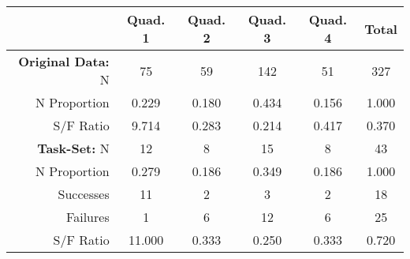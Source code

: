 \begin{tabular}{r|cccc|c}
                      & Quad. 1 & Quad. 2 & Quad. 3 & Quad. 4 & Total \\ \hline
\textbf{Original Data: }N &      75 &      59 &     142 &      51 &   327 \\
         N Proportion &   0.229 &   0.180 &   0.434 &   0.156 & 1.000 \\
            S/F Ratio &   9.714 &   0.283 &   0.214 &   0.417 & 0.370 \\ \hline
 \textbf{Task-Set:} N &      12 &       8 &      15 &       8 &    43 \\
         N Proportion &   0.279 &   0.186 &   0.349 &   0.186 & 1.000 \\
            Successes &      11 &       2 &       3 &       2 &    18 \\
             Failures &       1 &       6 &      12 &       6 &    25 \\
            S/F Ratio &  11.000 &   0.333 &   0.250 &   0.333 & 0.720 \\
\end{tabular}
